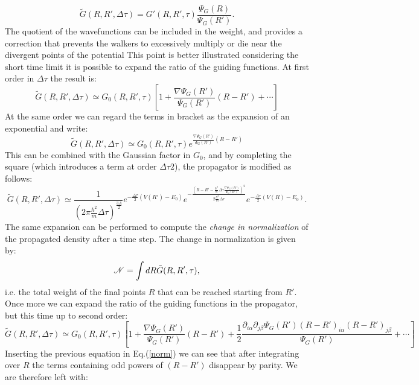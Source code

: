 \begin{equation}
\tilde{G}(R,R',\Delta\tau)=G'(R,R',\tau)\frac{\Psi_G(R)}{\Psi_G(R')}.
\end{equation}
The quotient of the wavefunctions can be included in the weight, and provides a correction that prevents the walkers to excessively multiply or die near the divergent points of the potential
This point is better illustrated considering the short time limit it is possible to expand the ratio of the guiding functions. At first order in $\Delta\tau$ the result is:
\begin{equation}
\tilde{G}(R,R',\Delta\tau)\simeq G_0(R,R',\tau)\left[1+\frac{\nabla\Psi_G(R')}{\Psi_G(R')}(R-R')+\cdots\right]
\end{equation}
At the same order we can regard the terms in bracket as the expansion of an exponential and write:
 \begin{equation}
 \tilde{G}(R,R',\Delta\tau)\simeq G_0(R,R',\tau)e^{\frac{\nabla\Psi_G(R')}
 	{\Psi_G(R')}(R-R')}
 \end{equation}
This can be combined with the Gaussian factor in $G_0$, and by completing the square (which introduces a term at order $\Delta\tau2$), the propagator is modified as follows:
\begin{equation}
\tilde{G}(R,R',\Delta\tau)\simeq\frac{1}{(2\pi\frac{\hbar^2}{m}\Delta\tau)^\frac{3A}{2}}e^{-\frac{\Delta\tau}{2}(V(R')-E_0)} e^{-\frac{(R-R'-\frac{\hbar^2}{m}\Delta\tau\frac{\nabla\Psi_G(R')}{\Psi_G(R')})^2}{2\frac{\hbar^2}{m}\Delta\tau}}e^{-\frac{\Delta\tau}{2}(V(R)-E_0)}.
\end{equation}
The same expansion can be performed to compute the {\it change in normalization} of the propagated density after a time step. The change in normalization is given by:
\begin{equation}
{\cal N}=\int dR \tilde{G}(R,R',\tau),\label{norm}
\end{equation}
i.e. the total weight of the final points $R$ that can be reached starting from $R'$.
Once more we can expand the ratio of the guiding functions in the propagator, but this time up to second order:
\begin{equation}
\tilde{G}(R,R',\Delta\tau)\simeq G_0(R,R',\tau)\left[1+\frac{\nabla\Psi_G(R')}{\Psi_G(R')}(R-R')+\frac{1}{2}\frac{\partial_{i\alpha}
\partial_{j\beta}\Psi_G(R')(R-R')_{i\alpha}(R-R')_{j\beta}}{\Psi_G(R')}+\cdots\right]
\end{equation}
Inserting the previous equation in Eq.(\ref{norm}) we can see that after integrating over $R$ the terms containing odd powers of $(R-R')$ disappear by parity. We are therefore left with:
